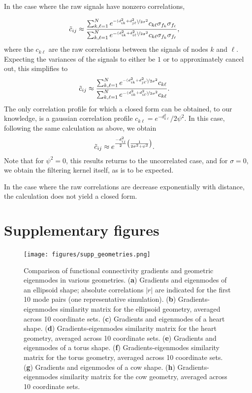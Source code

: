 \documentclass{article}
\begin{document}
In the case where the raw signals have nonzero correlations, 

\begin{align*}
    \Tilde{c}_{ij} &\approx \frac{\sum_{k, \ell =1}^N e^{\nicefrac{-(d_{ik}^2+d_{j\ell}^2)}{2\sigma^2}}c_{k\ell}\sigma_{f_k}\sigma_{f_\ell}}{\sum_{k, \ell=1}^N e^{-\nicefrac{(d_{ik}^2+ d_{i\ell}^2)}{2\sigma^2}}c_{k\ell}\sigma_{f_k}\sigma_{f_\ell}},
\end{align*}
where the $c_{k\ell}$ are the raw correlations between the signals of nodes $k$ and $\ell$. Expecting the variances of the signals to either be $1$ or to approximately cancel out, this simplifies to
\begin{align*}
    \Tilde{c}_{ij} &\approx \frac{\sum_{k, \ell =1}^N e^{\nicefrac{-(d_{ik}^2+d_{j\ell}^2)}{2\sigma^2}}c_{k\ell}}{\sum_{k, \ell=1}^N e^{-\nicefrac{(d_{ik}^2+ d_{i\ell}^2)}{2\sigma^2}}c_{k\ell}}.
\end{align*}
The only correlation profile for which a closed form can be obtained, to our knowledge, is a gaussian correlation profile $c_{k\ell} = e^{-d^2_{k\ell}}/2\psi^2$. In this case, following the same calculation as above, we obtain
\begin{align*}
    \Tilde{c}_{ij} &\approx e^{\frac{-d_{ij}^2}{2}\qty(\frac{1}{2\sigma^2+\psi^2})}.
\end{align*}
Note that for $\psi^2 = 0$, this results returns to the uncorrelated case, and for $\sigma = 0$, we obtain the filtering kernel itself, as is to be expected.

In the case where the raw correlations are decrease exponentially with distance, the calculation does not yield a closed form.

\newpage
\section*{Supplementary figures}

\renewcommand{\thefigure}{S\arabic{figure}}
\addtocounter{figure}{-7}

\begin{figure}[h]
    \centering
    \texttt{[image: figures/supp\_geometries.png]}
    \caption{Comparison of functional connectivity gradients and geometric eigenmodes in various geometries. (\textbf{a}) Gradients and eigenmodes of an ellipsoid shape; absolute correlations $|r|$ are indicated for the first 10 mode pairs (one representative simulation). (\textbf{b}) Gradients-eigenmodes similarity matrix for the ellipsoid geometry, averaged across 10 coordinate sets. (\textbf{c}) Gradients and eigenmodes of a heart shape. (\textbf{d}) Gradients-eigenmodes similarity matrix for the heart geometry, averaged across 10 coordinate sets. (\textbf{e}) Gradients and eigenmodes of a torus shape. (\textbf{f}) Gradients-eigenmodes similarity matrix for the torus geometry, averaged across 10 coordinate sets. (\textbf{g}) Gradients and eigenmodes of a cow shape. (\textbf{h}) Gradients-eigenmodes similarity matrix for the cow geometry, averaged across 10 coordinate sets.}
    \label{supp_geometries}
\end{figure}
\end{document}
